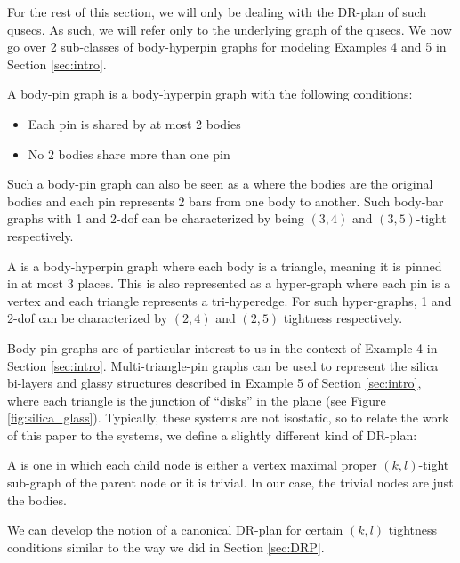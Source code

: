 For the rest of this section, we will only be dealing with the DR-plan  of such qusecs. As such, we will refer only to the underlying graph of the qusecs. We now go over 2 sub-classes of body-hyperpin graphs for modeling Examples 4 and 5 in Section \ref{sec:intro}.

\begin{definition}
\label{def:body-pin}
    A body-pin graph is a body-hyperpin graph with the following conditions:
    \begin{itemize}
        \item Each pin is shared by at most 2 bodies
        \item No 2 bodies share more than one pin
    \end{itemize}
    Such a body-pin graph can also be seen as a  where the bodies are the original bodies and each pin represents 2 bars from one body to another. Such body-bar graphs with 1 and 2-dof can be characterized by being $(3,4)$ and $(3,5)$-tight respectively.
\end{definition}

\begin{definition}
    A  is a body-hyperpin graph where each body is a triangle, meaning it is pinned in at most 3 places. This is also represented as a hyper-graph where each pin is a vertex and each triangle represents a tri-hyperedge. For such hyper-graphs, 1 and 2-dof can be characterized by $(2,4)$ and $(2,5)$ tightness respectively.
\end{definition}

Body-pin graphs are of particular interest to us in the context of Example 4 in Section \ref{sec:intro}. Multi-triangle-pin graphs can be used to represent the silica bi-layers and glassy structures described in Example 5 of Section \ref{sec:intro}, where each triangle is the junction of ``disks'' in the plane (see Figure \ref{fig:silica_glass}). Typically, these systems are not isostatic, so to relate the work of this paper to the systems, we define a slightly different kind of DR-plan:

\begin{definition}
    A  is one in which each child node is either a vertex maximal proper $(k,l)$-tight sub-graph of the parent node or it is trivial. In our case, the trivial nodes are just the bodies.
\end{definition}

We can develop the notion of a canonical DR-plan for certain $(k,l)$ tightness conditions similar to the way we did in Section \ref{sec:DRP}.

